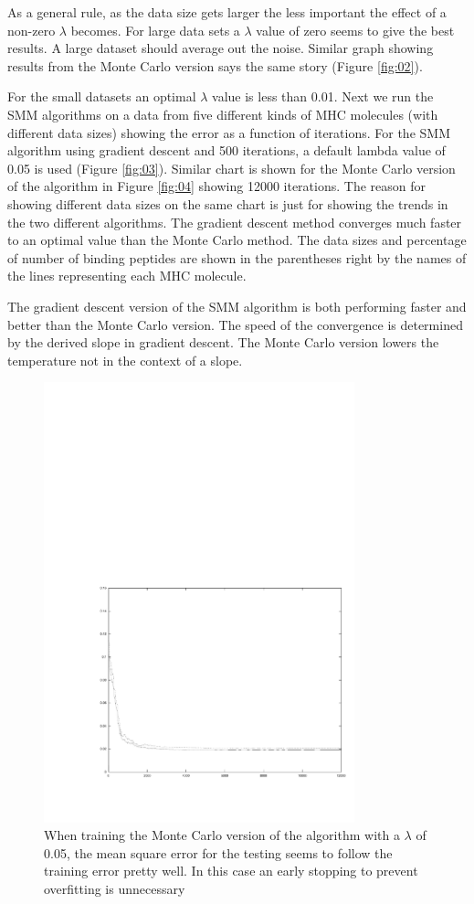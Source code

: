 \documentclass{bioinfo}
\begin{document}
\begin{application}
\par As a general rule, as the data size gets larger the less important the effect of a non-zero $\lambda$ becomes. For large data sets a $\lambda$ value of zero seems to give the best results. A large dataset should average out the noise. Similar graph showing results from the Monte Carlo version says the same story (Figure \ref{fig:02}).
\par For the small datasets an optimal $\lambda$ value is  less than 0.01. Next we run the SMM algorithms on a data from five different kinds of MHC molecules (with different data sizes) showing the error as a function of iterations. For the SMM algorithm using gradient descent and 500 iterations, a default lambda value of 0.05 is used (Figure \ref{fig:03}). Similar chart is shown for the Monte Carlo version of the algorithm in Figure \ref{fig:04} showing 12000 iterations. The reason for showing different data sizes on the same chart is just for showing the trends in the two different algorithms. The gradient descent method converges much faster to an optimal value than the Monte Carlo method. The data sizes and percentage of number of binding peptides are shown in the parentheses right by the names of the lines representing each MHC molecule.

\par The gradient descent version of the SMM algorithm is both performing faster and better than the Monte Carlo version. The speed of the convergence is determined by the derived slope in gradient descent. The Monte Carlo version lowers the temperature not in the context of a slope.
\begin{figure}[!tpb]
\centerline{\includegraphics[width=9cm]{overfitting_not.pdf}}
\caption{When training the Monte Carlo version of the algorithm with a $\lambda$ of 0.05, the mean square error for the testing seems to follow the training error pretty well. In this case an early stopping to prevent overfitting is unnecessary}
\label{fig:05}
\end{figure}


\end{application}
\end{document}
